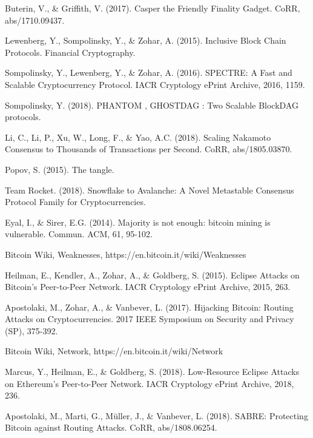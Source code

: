 \documentclass[12pt]{article}
\begin{document}
\begin{thebibliography}{99}
 Buterin, V., \& Griffith, V. (2017). Casper the Friendly Finality Gadget. CoRR, abs/1710.09437.

 Lewenberg, Y., Sompolinsky, Y., \& Zohar, A. (2015). Inclusive Block Chain Protocols. Financial Cryptography.

 Sompolinsky, Y., Lewenberg, Y., \& Zohar, A. (2016). SPECTRE: A Fast and Scalable Cryptocurrency Protocol. IACR Cryptology ePrint Archive, 2016, 1159.

 Sompolinsky, Y. (2018). PHANTOM , GHOSTDAG : Two Scalable BlockDAG protocols.

 Li, C., Li, P., Xu, W., Long, F., \& Yao, A.C. (2018). Scaling Nakamoto Consensus to Thousands of Transactions per Second. CoRR, abs/1805.03870.

 Popov, S. (2015). The tangle.

 Team Rocket. (2018). Snowflake to Avalanche: A Novel Metastable Consensus Protocol Family for
Cryptocurrencies.

 Eyal, I., \& Sirer, E.G. (2014). Majority is not enough: bitcoin mining is vulnerable. Commun. ACM, 61, 95-102.

 Bitcoin Wiki, Weaknesses, https://en.bitcoin.it/wiki/Weaknesses

 Heilman, E., Kendler, A., Zohar, A., \& Goldberg, S. (2015). Eclipse Attacks on Bitcoin's Peer-to-Peer Network. IACR Cryptology ePrint Archive, 2015, 263.

 Apostolaki, M., Zohar, A., \& Vanbever, L. (2017). Hijacking Bitcoin: Routing Attacks on Cryptocurrencies. 2017 IEEE Symposium on Security and Privacy (SP), 375-392.

 Bitcoin Wiki, Network, https://en.bitcoin.it/wiki/Network

 Marcus, Y., Heilman, E., \& Goldberg, S. (2018). Low-Resource Eclipse Attacks on Ethereum's Peer-to-Peer Network. IACR Cryptology ePrint Archive, 2018, 236.

 Apostolaki, M., Marti, G., Müller, J., \& Vanbever, L. (2018). SABRE: Protecting Bitcoin against Routing Attacks. CoRR, abs/1808.06254.

\end{thebibliography}
\end{document}
